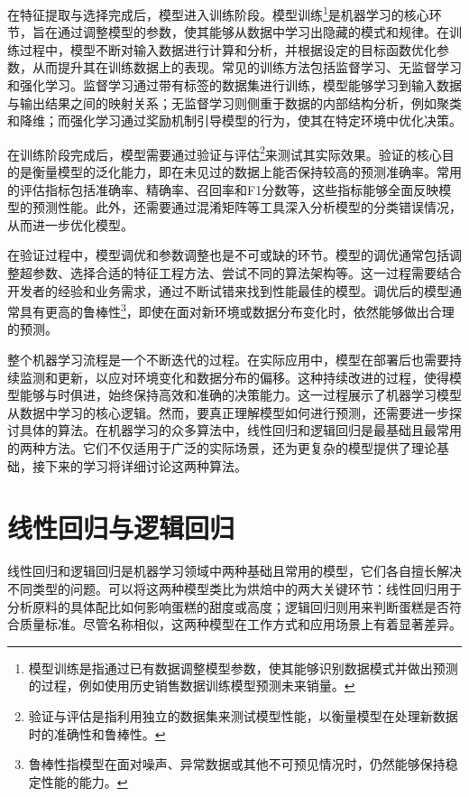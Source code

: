 在特征提取与选择完成后，模型进入训练阶段。模型训练\footnote{模型训练是指通过已有数据调整模型参数，使其能够识别数据模式并做出预测的过程，例如使用历史销售数据训练模型预测未来销量。}是机器学习的核心环节，旨在通过调整模型的参数，使其能够从数据中学习出隐藏的模式和规律。在训练过程中，模型不断对输入数据进行计算和分析，并根据设定的目标函数优化参数，从而提升其在训练数据上的表现。常见的训练方法包括监督学习、无监督学习和强化学习。监督学习通过带有标签的数据集进行训练，模型能够学习到输入数据与输出结果之间的映射关系；无监督学习则侧重于数据的内部结构分析，例如聚类和降维；而强化学习通过奖励机制引导模型的行为，使其在特定环境中优化决策。

在训练阶段完成后，模型需要通过验证与评估\footnote{验证与评估是指利用独立的数据集来测试模型性能，以衡量模型在处理新数据时的准确性和鲁棒性。}来测试其实际效果。验证的核心目的是衡量模型的泛化能力，即在未见过的数据上能否保持较高的预测准确率。常用的评估指标包括准确率、精确率、召回率和F1分数等，这些指标能够全面反映模型的预测性能。此外，还需要通过混淆矩阵等工具深入分析模型的分类错误情况，从而进一步优化模型。

在验证过程中，模型调优和参数调整也是不可或缺的环节。模型的调优通常包括调整超参数、选择合适的特征工程方法、尝试不同的算法架构等。这一过程需要结合开发者的经验和业务需求，通过不断试错来找到性能最佳的模型。调优后的模型通常具有更高的鲁棒性\footnote{鲁棒性指模型在面对噪声、异常数据或其他不可预见情况时，仍然能够保持稳定性能的能力。}，即使在面对新环境或数据分布变化时，依然能够做出合理的预测。

整个机器学习流程是一个不断迭代的过程。在实际应用中，模型在部署后也需要持续监测和更新，以应对环境变化和数据分布的偏移。这种持续改进的过程，使得模型能够与时俱进，始终保持高效和准确的决策能力。这一过程展示了机器学习模型从数据中学习的核心逻辑。然而，要真正理解模型如何进行预测，还需要进一步探讨具体的算法。在机器学习的众多算法中，线性回归和逻辑回归是最基础且最常用的两种方法。它们不仅适用于广泛的实际场景，还为更复杂的模型提供了理论基础，接下来的学习将详细讨论这两种算法。

\section{线性回归与逻辑回归}

线性回归和逻辑回归是机器学习领域中两种基础且常用的模型，它们各自擅长解决不同类型的问题。可以将这两种模型类比为烘焙中的两大关键环节：线性回归用于分析原料的具体配比如何影响蛋糕的甜度或高度；逻辑回归则用来判断蛋糕是否符合质量标准。尽管名称相似，这两种模型在工作方式和应用场景上有着显著差异。

